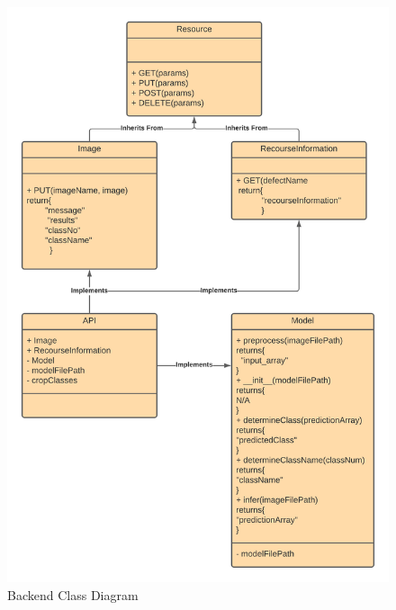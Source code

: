     \begin{figure}[H]
      \begin{center}
        \includegraphics[scale=0.7]{Images/API_InheritenceV3}
        \caption{Backend Class Diagram}
        \label{fig:api_inheritence}
      \end{center}
    \end{figure}

